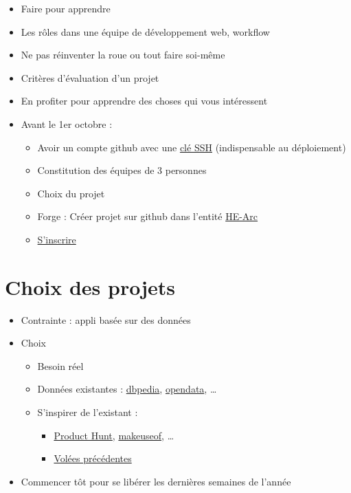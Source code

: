 \begin{itemize}
\tightlist
\item
  Faire pour apprendre
\item
  Les rôles dans une équipe de développement web, workflow
\item
  Ne pas réinventer la roue ou tout faire soi-même
\item
  Critères d'évaluation d'un projet
\item
  En profiter pour apprendre des choses qui vous intéressent
\item
  Avant le 1er octobre :

  \begin{itemize}
  \tightlist
  \item
    Avoir un compte github avec une
    \href{https://github.com/settings/keys}{clé SSH} (indispensable au
    déploiement)
  \item
    Constitution des équipes de 3 personnes
  \item
    Choix du projet
  \item
    Forge : Créer projet sur github dans l'entité
    \href{https://github.com/HE-Arc/}{HE-Arc}
  \item
    \href{https://github.com/HE-Arc/slides-devweb/wiki/Projets-2022-2023}{S'inscrire}
  \end{itemize}
\end{itemize}

\hypertarget{choix-des-projets}{%
\section{Choix des projets}\label{choix-des-projets}}

\begin{itemize}
\tightlist
\item
  Contrainte : appli basée sur des données
\item
  Choix

  \begin{itemize}
  \tightlist
  \item
    Besoin réel
  \item
    Données existantes : \href{http://wiki.dbpedia.org/}{dbpedia},
    \href{https://opendata.swiss/fr/}{opendata}, \ldots{}
  \item
    S'inspirer de l'existant :

    \begin{itemize}
    \tightlist
    \item
      \href{https://www.producthunt.com/topics/web-app}{Product Hunt},
      \href{http://www.makeuseof.com/tag/best-websites-internet/}{makeuseof},
      \ldots{}
    \item
      \href{https://github.com/HE-Arc/}{Volées précédentes}
    \end{itemize}
  \end{itemize}
\item
  Commencer tôt pour se libérer les dernières semaines de l'année
\end{itemize}

